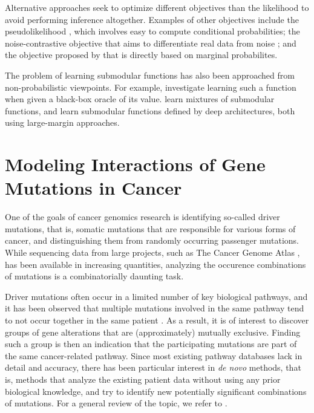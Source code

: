 Alternative approaches seek to optimize different objectives than the likelihood to avoid performing inference altogether.
Examples of other objectives include the pseudolikelihood \citep{pseudolik}, which involves easy to compute conditional probabilities; the noise-contrastive objective that aims to differentiate real data from noise \cite{nce,tschiatschek16}; and the objective proposed by \cite{domke13} that is directly based on marginal probabilites.

The problem of learning submodular functions has also been approached from non-probabilistic viewpoints.
For example, \cite{balcan} investigate learning such a function when given a black-box oracle of its value. \cite{tschiatscheck14} learn mixtures of submodular functions, and \cite{deepsubmod} learn submodular functions defined by deep architectures, both using large-margin approaches.

\section{Modeling Interactions of Gene Mutations in Cancer}
One of the goals of cancer genomics research is identifying so-called driver mutations, that is, somatic mutations that are responsible for various forms of cancer, and distinguishing them from randomly occurring passenger mutations.
While sequencing data from large projects, such as The Cancer Genome Atlas \citep{tcga}, has been available in increasing quantities, analyzing the occurence combinations of mutations is a combinatorially daunting task.

Driver mutations often occur in a limited number of key biological pathways, and it has been observed that multiple mutations involved in the same pathway tend to not occur together in the same patient \citep{yeang08}.
As a result, it is of interest to discover groups of gene alterations that are (approximately) mutually exclusive.
Finding such a group is then an indication that the participating mutations are part of the same cancer-related pathway.
Since most existing pathway databases lack in detail and accuracy, there has been particular interest in \emph{de novo} methods, that is, methods that analyze the existing patient data without using any prior biological knowledge, and try to identify new potentially significant combinations of mutations.
For a general review of the topic, we refer to \cite{raphael14}.

